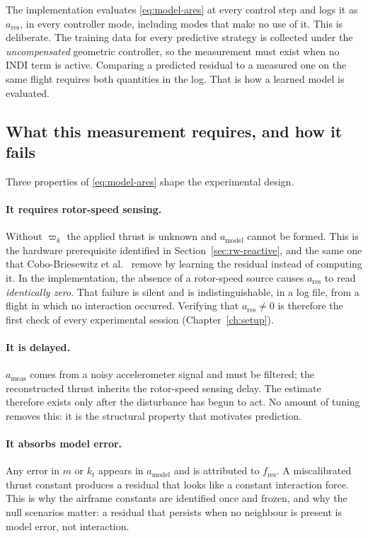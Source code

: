 The implementation evaluates \eqref{eq:model-ares} at every control step and logs it as
$a_{\mathrm{res}}$, in every controller mode, including modes that make no use of it. This is
deliberate. The training data for every predictive strategy is collected under the \emph{uncompensated}
geometric controller, so the measurement must exist when no INDI term is active. Comparing a
predicted residual to a measured one on the same flight requires both quantities in the log.
That is how a learned model is evaluated.

\subsection{What this measurement requires, and how it fails}
\label{sec:model-measure-fail}

Three properties of \eqref{eq:model-ares} shape the experimental design.

\paragraph{It requires rotor-speed sensing.} Without $\varpi_k$ the applied thrust is unknown and
$a_{\mathrm{model}}$ cannot be formed. This is the hardware prerequisite identified in
Section~\ref{sec:rw-reactive}, and the same one that Cobo-Briesewitz et
al.~\cite{cobobriesewitz2026lindi} remove by learning the residual instead of computing it. In the
implementation, the absence of a rotor-speed source causes $a_{\mathrm{res}}$ to read
\emph{identically zero}. That failure is silent and is indistinguishable, in a log file, from a
flight in which no interaction occurred. Verifying that $a_{\mathrm{res}} \neq 0$ is therefore the
first check of every experimental session (Chapter~\ref{ch:setup}).

\paragraph{It is delayed.} $a_{\mathrm{meas}}$ comes from a noisy accelerometer signal
and must be filtered; the reconstructed thrust inherits the rotor-speed sensing delay. The estimate
therefore exists only after the disturbance has begun to act. No amount of tuning removes this: it
is the structural property that motivates prediction.

\paragraph{It absorbs model error.} Any error in $m$ or $k_t$ appears in $a_{\mathrm{model}}$ and is
attributed to $f_{\mathrm{res}}$. A miscalibrated thrust constant produces a residual that looks
like a constant interaction force. This is why the airframe constants are identified once and
frozen, and why the null scenarios matter: a residual that persists when no neighbour is present is
model error, not interaction.


